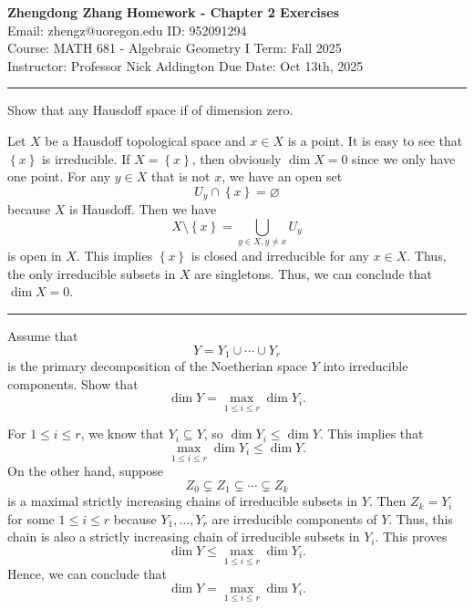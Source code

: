 \documentclass[letterpaper, 12pt]{article}
\begin{document}
\noindent
\large\textbf{Zhengdong Zhang} \hfill \textbf{Homework - Chapter 2 Exercises}   \\
Email: zhengz@uoregon.edu \hfill ID: 952091294 \\
\normalsize Course: MATH 681 - Algebraic Geometry I \hfill Term: Fall 2025 \\
Instructor: Professor Nick Addington \hfill Due Date: Oct 13th, 2025 \\
\noindent\rule{7in}{2.8pt}
\begin{problem}{2.3}
Show that any Hausdoff space if of dimension zero.
\end{problem}
\begin{solution}
Let \(X\) be a Hausdoff topological space and \(x\in X\) is a point. It is easy to see that \(\left\{ x \right\}\) is irreducible. If \(X=\left\{ x \right\}\), then obviously \(\dim X=0\) since we only have one point. For any \(y\in X\) that is not \(x\), we have an open set 
\[U_y\cap \left\{ x \right\}=\varnothing\]
because \(X\) is Hausdoff. Then we have 
\[X\setminus \left\{ x \right\}=\bigcup_{y\in X, y\neq x}U_y\]
is open in \(X\). This implies \(\left\{ x \right\}\) is closed and irreducible for any \(x\in X\). Thus, the only irreducible subsets in \(X\) are singletons. Thus, we can conclude that \(\dim X=0\).
\end{solution}

\noindent\rule{7in}{2.8pt}
\begin{problem}{2.4}
Assume that 
\[Y=Y_1\cup\cdots \cup Y_r\]
is the primary decomposition of the Noetherian space \(Y\) into irreducible components. Show that 
\[\dim Y=\max_{1\leq i\leq r} \dim Y_i.\]
\end{problem}
\begin{solution}
For \(1\leq i\leq r\), we know that \(Y_i\subseteq Y\), so \(\dim Y_i\leq \dim Y\). This implies that 
\[\max_{1\leq i\leq r}\dim Y_i\leq \dim Y.\]
On the other hand, suppose 
\[Z_0\subsetneq Z_1\subsetneq \cdots\subsetneq Z_k\]
is a maximal strictly increasing chains of irreducible subsets in \(Y\). Then \(Z_k=Y_i\) for some \(1\leq i\leq r\) because \(Y_1,\ldots,Y_r\) are irreducible components of \(Y\). Thus, this chain is also a strictly increasing chain of irreducible subsets in \(Y_i\). This proves 
\[\dim Y\leq \max_{1\leq i\leq r}\dim Y_i.\]
Hence, we can conclude that 
\[\dim Y=\max_{1\leq i\leq r}\dim Y_i.\]
\end{solution}
\end{document}
